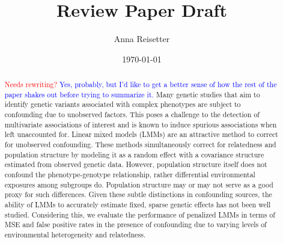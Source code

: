 \documentclass[a4paper]{article}
\title{Review Paper Draft}
\author{Anna Reisetter}
\date{\today}
\providecommand{\note}[1]{\textcolor{red}{#1}}
\providecommand{\anna}[1]{\textcolor{blue}{#1}}
\begin{document}
\maketitle

\begin{abstract}
\note{Needs rewriting?}
\anna{Yes, probably, but I'd like to get a better sense of how the rest of the paper shakes out before trying to summarize it.}
Many genetic studies that aim to identify genetic variants associated with complex phenotypes are subject to confounding due to unobserved factors. This poses a challenge to the detection of multivariate associations of interest and is known to induce spurious associations when left unaccounted for. Linear mixed models (LMMs) are an attractive method to correct for unobserved confounding. These methods simultaneously correct for relatedness and population structure by modeling it as a random effect with a covariance structure estimated from observed genetic data. However, population structure itself does not confound the phenotype-genotype relationship, rather differential environmental exposures among subgroups do. Population structure may or may not serve as a good proxy for such differences. Given these subtle distinctions in confounding sources, the ability of LMMs to accurately estimate fixed, sparse genetic effects has not been well studied. Considering this, we evaluate the performance of penalized LMMs in terms of MSE and false positive rates in the presence of confounding due to varying levels of environmental heterogeneity and relatedness.
\end{abstract}



\newpage



\end{document}
